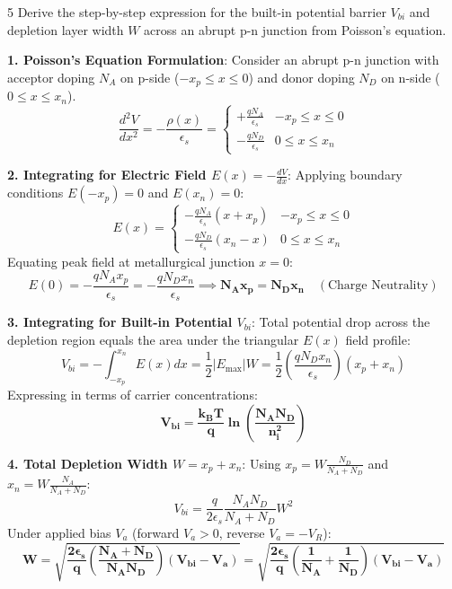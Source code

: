 \begin{theoryq}{5}
Derive the step-by-step expression for the built-in potential barrier $V_{bi}$ and depletion layer width $W$ across an abrupt p-n junction from Poisson's equation.
\end{theoryq}
\begin{theorysol}
\textbf{1. Poisson's Equation Formulation}:
Consider an abrupt p-n junction with acceptor doping $N_A$ on p-side ($-x_p \le x \le 0$) and donor doping $N_D$ on n-side ($0 \le x \le x_n$).
\begin{equation}
\frac{d^2 V}{dx^2} = -\frac{\rho(x)}{\epsilon_s} = \begin{cases} +\frac{q N_A}{\epsilon_s} & -x_p \le x \le 0 \\ -\frac{q N_D}{\epsilon_s} & 0 \le x \le x_n \end{cases}
\end{equation}

\textbf{2. Integrating for Electric Field $E(x) = -\frac{dV}{dx}$}:
Applying boundary conditions $E(-x_p) = 0$ and $E(x_n) = 0$:
\begin{equation}
E(x) = \begin{cases} -\frac{q N_A}{\epsilon_s}(x + x_p) & -x_p \le x \le 0 \\ -\frac{q N_D}{\epsilon_s}(x_n - x) & 0 \le x \le x_n \end{cases}
\end{equation}
Equating peak field at metallurgical junction $x=0$:
\begin{equation}
E(0) = -\frac{q N_A x_p}{\epsilon_s} = -\frac{q N_D x_n}{\epsilon_s} \implies \mathbf{N_A x_p = N_D x_n} \quad (\text{Charge Neutrality})
\end{equation}

\textbf{3. Integrating for Built-in Potential $V_{bi}$}:
Total potential drop across the depletion region equals the area under the triangular $E(x)$ field profile:
\begin{equation}
V_{bi} = -\int_{-x_p}^{x_n} E(x) dx = \frac{1}{2}|E_{\text{max}}| W = \frac{1}{2}\left(\frac{q N_D x_n}{\epsilon_s}\right)(x_p + x_n)
\end{equation}
Expressing in terms of carrier concentrations:
\begin{equation}
\mathbf{V_{bi} = \frac{k_BT}{q}\ln\left(\frac{N_A N_D}{n_i^2}\right)}
\end{equation}

\textbf{4. Total Depletion Width $W = x_p + x_n$}:
Using $x_p = W \frac{N_D}{N_A + N_D}$ and $x_n = W \frac{N_A}{N_A + N_D}$:
\begin{equation}
V_{bi} = \frac{q}{2\epsilon_s}\frac{N_A N_D}{N_A + N_D} W^2
\end{equation}
Under applied bias $V_a$ (forward $V_a > 0$, reverse $V_a = -V_R$):
\begin{equation}
\mathbf{W = \sqrt{\frac{2\epsilon_s}{q}\left(\frac{N_A + N_D}{N_A N_D}\right)(V_{bi} - V_a)} = \sqrt{\frac{2\epsilon_s}{q}\left(\frac{1}{N_A} + \frac{1}{N_D}\right)(V_{bi} - V_a)}}
\end{equation}
\end{theorysol}
\vspace{4mm}

